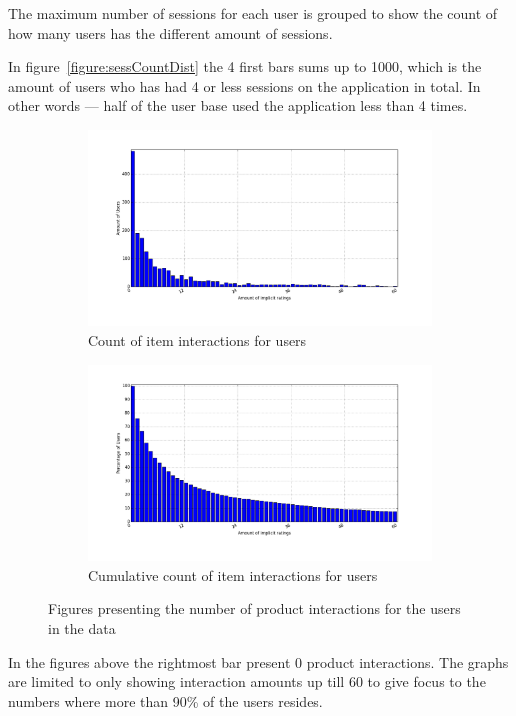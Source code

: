         The maximum number of sessions for each user is grouped to show the count of how many users has the different amount of sessions.

        In figure~\ref{figure:sessCountDist} the 4 first bars sums up to 1000, which is the amount of users who has had 4 or less sessions on the application in total. In other words --- half of the user base used the application less than 4 times.


    \begin{figure}[H]
        \centering
        \begin{subfigure}{.5\textwidth}
            \includegraphics[width=\dualGraphWidth]{image/ratingsPerUserdistribution.png}
            \centering
            \caption{Count of item interactions for users}
    \label{figure:ratingsPerUser}
        \end{subfigure}%
        \begin{subfigure}{.5\textwidth}
            \includegraphics[width=\dualGraphWidth]{image/ratingsPerUsercumdistribution.png}
            \centering
            \caption{Cumulative count of item interactions for users}
    \label{figure:ratingsPerUserCum}
        \end{subfigure}
        \caption{Figures presenting the number of product interactions for the users in the data}
    \end{figure}
        In the figures above the rightmost bar present 0 product interactions.
        The graphs are limited to only showing interaction amounts up till 60 to give focus to the numbers where more than 90\% of the users resides.

